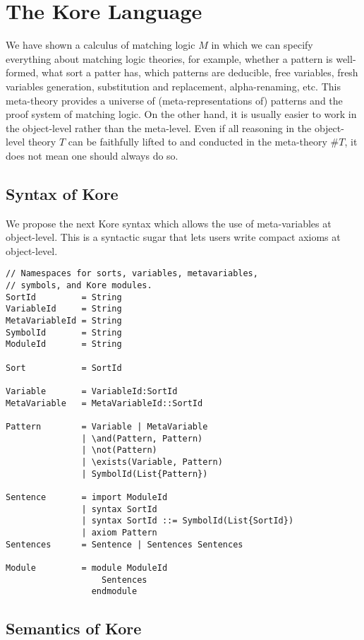 \documentclass[UTF8]{article}
\theoremstyle{plain}
\theoremstyle{definition}
\theoremstyle{remark}
\begin{document}
\section{The Kore Language}

We have shown a calculus of matching logic $M$ in which we can specify everything about 
matching logic theories, for example, whether a pattern is well-formed, what 
sort a patter has, which patterns are deducible, free variables, fresh 
variables generation, substitution and replacement, alpha-renaming, etc.
This meta-theory provides a universe of (meta-representations of) 
patterns and the proof system of matching logic. 
On the other hand, it is usually easier to work in the object-level rather than the 
meta-level. 
Even if all reasoning in the object-level theory $T$ can be faithfully lifted to and conducted in the 
meta-theory $\#T$, it does not mean one should always do so. 

\subsection{Syntax of Kore}
We propose the next Kore syntax which allows the use of meta-variables at object-level. This is a syntactic sugar that lets users write compact axioms at object-level.

\begin{Verbatim}[fontsize=\small]
// Namespaces for sorts, variables, metavariables,
// symbols, and Kore modules.
SortId         = String
VariableId     = String
MetaVariableId = String
SymbolId       = String
ModuleId       = String

Sort           = SortId

Variable       = VariableId:SortId
MetaVariable   = MetaVariableId::SortId

Pattern        = Variable | MetaVariable
               | \and(Pattern, Pattern)
               | \not(Pattern)
               | \exists(Variable, Pattern)
               | SymbolId(List{Pattern})

Sentence       = import ModuleId
               | syntax SortId
               | syntax SortId ::= SymbolId(List{SortId})
               | axiom Pattern
Sentences      = Sentence | Sentences Sentences

Module         = module ModuleId
                   Sentences
                 endmodule
\end{Verbatim}

\subsection{Semantics of Kore}
\end{document}

